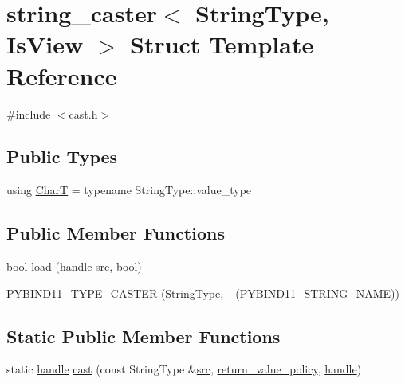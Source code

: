 \hypertarget{structstring__caster}{}\section{string\+\_\+caster$<$ String\+Type, Is\+View $>$ Struct Template Reference}
\label{structstring__caster}


{\ttfamily \#include $<$cast.\+h$>$}

\subsection*{Public Types}
\begin{DoxyCompactItemize}
\item 
using \mbox{\hyperlink{structstring__caster_a0d5228e9253c85b930b6230662f2f60c}{CharT}} = typename String\+Type\+::value\+\_\+type
\end{DoxyCompactItemize}
\subsection*{Public Member Functions}
\begin{DoxyCompactItemize}
\item 
\mbox{\hyperlink{asdl_8h_af6a258d8f3ee5206d682d799316314b1}{bool}} \mbox{\hyperlink{structstring__caster_aa38bc121001de95bcf9c45ddbffdb635}{load}} (\mbox{\hyperlink{classhandle}{handle}} \mbox{\hyperlink{_s_d_l__opengl__glext_8h_a72e0fdf0f845ded60b1fada9e9195cd7}{src}}, \mbox{\hyperlink{asdl_8h_af6a258d8f3ee5206d682d799316314b1}{bool}})
\item 
\mbox{\hyperlink{structstring__caster_afe8c27c979388d23f805bb38f04d94ab}{P\+Y\+B\+I\+N\+D11\+\_\+\+T\+Y\+P\+E\+\_\+\+C\+A\+S\+T\+ER}} (String\+Type, \mbox{\hyperlink{descr_8h_af114703e20c6527e87163eb2798f74b8}{\+\_\+}}(\mbox{\hyperlink{detail_2common_8h_a4490c1733364f04fcea017da2eb38d38}{P\+Y\+B\+I\+N\+D11\+\_\+\+S\+T\+R\+I\+N\+G\+\_\+\+N\+A\+ME}}))
\end{DoxyCompactItemize}
\subsection*{Static Public Member Functions}
\begin{DoxyCompactItemize}
\item 
static \mbox{\hyperlink{classhandle}{handle}} \mbox{\hyperlink{structstring__caster_aac6f059b620b6ada6aed354b9c3f0b56}{cast}} (const String\+Type \&\mbox{\hyperlink{_s_d_l__opengl__glext_8h_a72e0fdf0f845ded60b1fada9e9195cd7}{src}}, \mbox{\hyperlink{detail_2common_8h_adde72ab1fb0dd4b48a5232c349a53841}{return\+\_\+value\+\_\+policy}}, \mbox{\hyperlink{classhandle}{handle}})
\end{DoxyCompactItemize}
